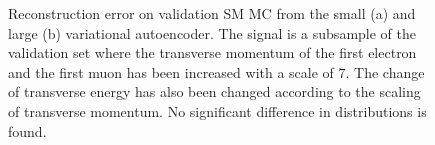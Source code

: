 \begin{figure}[H]
\begin{subfigure}{.45\textwidth}
        \caption{ }
        \label{fig:VAE_big_pt_7}
    \end{subfigure}
    \hfill 
    \caption[VAE | Reconstruction error $p_T$ altering of 7]{Reconstruction error on validation SM MC from the small (a) and large (b) variational autoencoder. The signal is a subsample of the validation 
    set where the transverse momentum of the first electron and the first muon has been increased with a scale of $7$. The change of transverse 
    energy has also been changed according to the scaling of transverse momentum. No significant difference in distributions is found.  }
    \label{fig:VAE_big_small_pt_7}
\end{figure}
